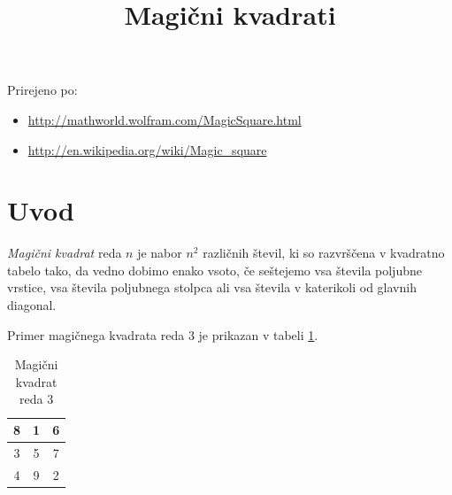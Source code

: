 \documentclass[a4paper,12pt]{article}
\title{Magični kvadrati}
\date{}
\begin{document}
\maketitle

Prirejeno po:

\begin{itemize}
    \item \url{http://mathworld.wolfram.com/MagicSquare.html}
    \item \url{http://en.wikipedia.org/wiki/Magic_square}
\end{itemize}
\tableofcontents



\newpage

\section{Uvod}

 \begin{definicija}
   \emph{Magični kvadrat} reda \(n\) je nabor \(n^2\) različnih števil,
   ki so razvrščena v kvadratno tabelo tako, da vedno dobimo enako vsoto,
   če seštejemo vsa števila poljubne vrstice, vsa števila poljubnega
   stolpca ali vsa števila v katerikoli od glavnih diagonal.
\end{definicija}

Primer magičnega kvadrata reda 3 je prikazan v tabeli \ref{table:mag3}. %

\begin{table}[htbp]
    \centering
    \caption{Magični kvadrat reda 3}
    \label{table:mag3}
    \begin{tabular}{|c|c|c|}
        8 & 1 & 6 \\\hline
        3 & 5 & 7 \\\hline
        4 & 9 & 2 \\\hline
    \end{tabular}
\end{table}
\end{document}
